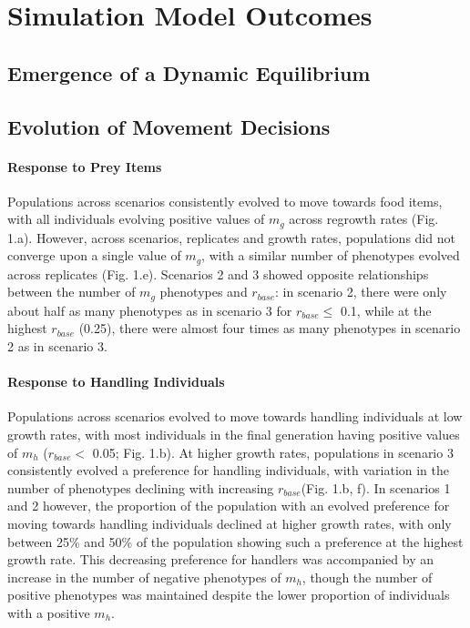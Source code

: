 \documentclass[11pt]{article}
\begin{document}
\section*{Simulation Model Outcomes}

\subsection*{Emergence of a Dynamic Equilibrium}

\subsection*{Evolution of Movement Decisions}

\paragraph*{Response to Prey Items}

Populations across scenarios consistently evolved to move towards food items, with all individuals evolving positive values of $m_g$ across regrowth rates (Fig. 1.a).
However, across scenarios, replicates and growth rates, populations did not converge upon a single value of $m_g$, with a similar number of phenotypes evolved across replicates (Fig. 1.e).
Scenarios 2 and 3 showed opposite relationships between the number of $m_g$ phenotypes and $r_{base}$: in scenario 2, there were only about half as many phenotypes as in scenario 3 for $r_{base} \leq$ 0.1, while at the highest $r_{base}$ (0.25), there were almost four times as many phenotypes in scenario 2 as in scenario 3.

\paragraph*{Response to Handling Individuals}

Populations across scenarios evolved to move towards handling individuals at low growth rates, with most individuals in the final generation having positive values of $m_h$ ($r_{base} <$ 0.05; Fig. 1.b).
At higher growth rates, populations in scenario 3 consistently evolved a preference for handling individuals, with variation in the number of phenotypes declining with increasing $r_{base} $(Fig. 1.b, f).
In scenarios 1 and 2 however, the proportion of the population with an evolved preference for moving towards handling individuals declined at higher growth rates, with only between 25\% and 50\% of the population showing such a preference at the highest growth rate.
This decreasing preference for handlers was accompanied by an increase in the number of negative phenotypes of $m_h$, though the number of positive phenotypes was maintained despite the lower proportion of individuals with a positive $m_h$.
\end{document}
